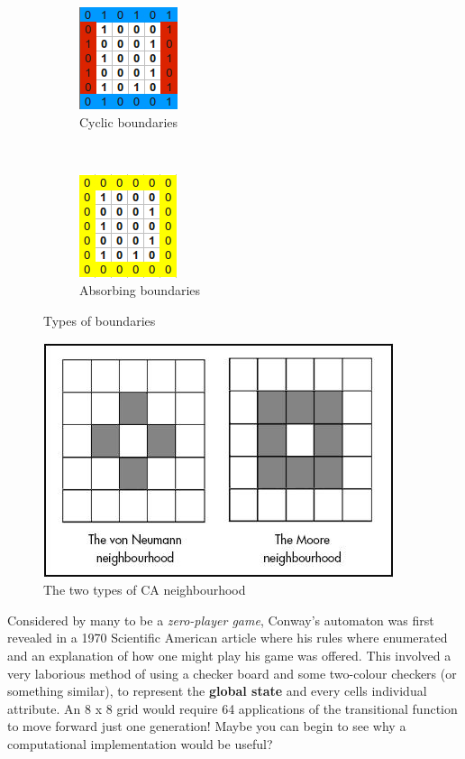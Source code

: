 \documentclass[11pt]{article} %
\begin{document}
\begin{figure}[h]
        \centering
        \begin{subfigure}[h]{0.3\textwidth}
                \centering
                \includegraphics[scale=1]{cyclic}
                \caption{Cyclic boundaries}
                \label{fig:cyclic}
        \end{subfigure}%
        ~ %
        \begin{subfigure}[h]{0.3\textwidth}
                \centering
                \includegraphics[scale=1]{absorbing}
                \caption{Absorbing boundaries}
                \label{fig:absorb}
        \end{subfigure}
        \caption{Types of boundaries}\label{fig:boundaries}
\end{figure}

\begin{figure}[h]
\centering
\includegraphics[scale=0.75]{neighbourhood}
\caption{The two types of CA neighbourhood}
\label{fig:neighbourhood}
\end{figure}
Considered by many to be a \emph{zero-player game}, Conway's automaton was first revealed in a 1970 Scientific American article \cite{ref7} where his rules where enumerated and an explanation of how one might play his game was offered. This involved a very laborious method of using a checker board and some two-colour checkers (or something similar), to represent the {\bf global state} and every cells individual attribute. An 8 x 8 grid would require 64 applications of the transitional function to move forward just one generation! Maybe you can begin to see why a computational implementation would be useful?
\end{document}
